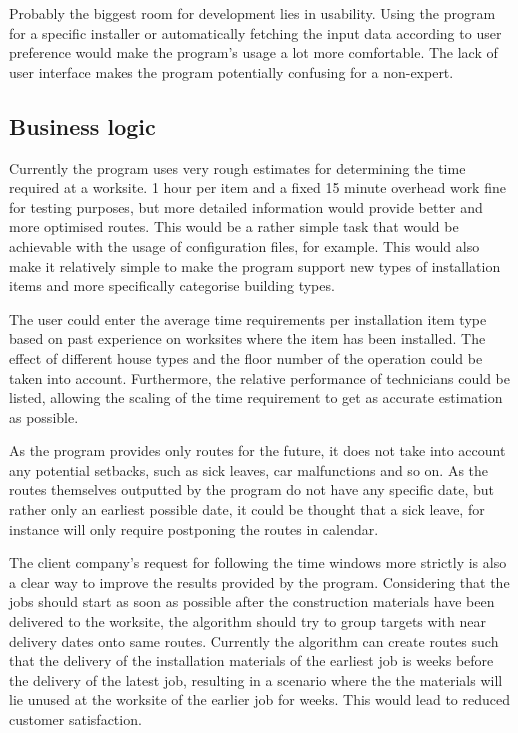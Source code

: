 Probably the biggest room for development lies in usability. Using the program for a specific installer or automatically fetching the input data according to user preference would make the program's usage a lot more comfortable. The lack of user interface makes the program potentially confusing for a non-expert.


\subsection{Business logic}

Currently the program uses very rough estimates for determining the time required at a worksite. 1 hour per item and a fixed 15 minute overhead work fine for testing purposes, but more detailed information would provide better and more optimised routes. This would be a rather simple task that would be achievable with the usage of configuration files, for example. This would also make it relatively simple to make the program support new types of installation items and more specifically categorise building types.

The user could enter the average time requirements per installation item type based on past experience on worksites where the item has been installed. The effect of different house types and the floor number of the operation could be taken into account. Furthermore, the relative performance of technicians could be listed, allowing the scaling of the time requirement to get as accurate estimation as possible.

As the program provides only routes for the future, it does not take into account any potential setbacks, such as sick leaves, car malfunctions and so on. As the routes themselves outputted by the program do not have any specific date, but rather only an earliest possible date, it could be thought that a sick leave, for instance will only require postponing the routes in calendar.  

The client company's request for following the time windows more strictly is also a clear way to improve the results provided by the program. Considering that the jobs should start as soon as possible after the construction materials have been delivered to the worksite, the algorithm should try to group targets with near delivery dates onto same routes. Currently the algorithm can create routes such that the delivery of the installation materials of the earliest job is weeks before the delivery of the latest job, resulting in a scenario where the the materials will lie  unused at the worksite of the earlier job for weeks. This would lead to reduced customer satisfaction.

